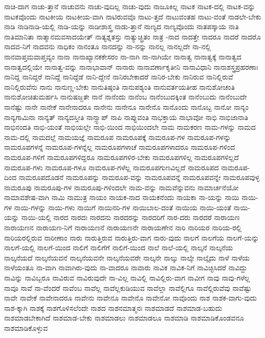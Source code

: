{ನಾಚಿ-ದಾಗ
ನಾಚು-ತ್ತಾನೆ
ನಾಚುವನು
ನಾಚು-ವುದಿಲ್ಲ
ನಾಚು-ವುದು
ನಾಜೂಕಿಲ್ಲ
ನಾಟಕ
ನಾಟಕ-ದಲ್ಲಿ
ನಾಟಕ-ವನ್ನು
ನಾಟಕವೊಂದು
ನಾಟಕೀಯ
ನಾಟಕೀಯ-ವಾಗಿ
ನಾಟಿರುವವೊ
ನಾಟು-ತ್ತದೆ
ನಾಟುವಂತಹ
ನಾಟು-ವಂತೆ
ನಾಡಲೇ-ಬೇಕು
ನಾಡಿ
ನಾಡಿನಾಡಿ-ಯಲ್ಲಿ
ನಾಡಿ-ಯನ್ನು
ನಾಡೀಶಾಸ್ತ್ರ
ನಾಡು-ತ್ತಾನೆ
ನಾಣ್ಯದ
ನಾಣ್ಯವೊಂದು
ನಾತಪಸ್ಕಾಯ
ನಾತಿ
ನಾತಿಮಾನಿತಾ
ನಾತ್ಮಾನಮವಸಾದಯೇತ್
ನಾತ್ಯಶ್ನತಸ್ತು
ನಾತ್ಯುಚ್ಛ್ರಿತಂ
ನಾತ್ರ
-ನಾದ
ನಾದತ್ತೇ
ನಾದರೂ
ನಾದರೆ
ನಾದರೊ
ನಾದವ-ನಿಗೆ
ನಾದವನು
ನಾಧಿಕಂ
ನಾನಂತೂ
ನಾನದನ್ನು
ನಾ-ನನ್ನು
ನಾನಲ್ಲ
ನಾನಲ್ಲದೇ
ನಾ-ನಲ್ಲಿ
ನಾನವಾಪ್ತಮವಾಪ್ತವ್ಯಂ
ನಾನಾ
ನಾನಾಖ್ಯಾನಕಕೇಸರಂ
ನಾ-ನಾಗಿ
ನಾ-ನಾಗಿಯೇ
ನಾನಾತ್ವ
ನಾನಾತ್ವಕ್ಕೆ
ನಾನಾತ್ವದ
ನಾನಾತ್ವದಲ್ಲಿಯೇ
ನಾನಾತ್ವ-ವನ್ನು
ನಾನಾಭಾವಾನ್
ನಾನಾರು
ನಾನಾವರ್ಣಾಕೃತೀನಿ
ನಾನಾವಿಧಾನಿ
ನಾನಾಶಸ್ತ್ರಪ್ರಹರಣಾಃ
ನಾನಿದ್ದ
ನಾನಿದ್ದರೆ
ನಾನಿದ್ದೆ
ನಾನಿದ್ದೆಡೆ
ನಾನಿ-ದ್ದೇನೆ
ನಾನಿರಬೇಕಾದರೆ
ನಾನಿರ-ಬೇಕು
ನಾನಿರುವ
ನಾನಿಲ್ಲಿರುವೆ
ನಾನಿಲ್ಲಿರುವೆನು
ನಾನು
ನಾನುಣ್ಣ-ಬೇಕು
ನಾನುತಿಷ್ಠಂತಿ
ನಾನುಪಶ್ಯಂತಿ
ನಾನುವರ್ತಯತೀಹ
ನಾನುಶೋಚಂತಿ
ನಾನುಶೋಚಿತುಮರ್ಹಸಿ
ನಾನುಷಜ್ಜತೇ
ನಾನೆ
ನಾನೆಂದು
ನಾನೆಂಬ
ನಾನೆಂಬುದಕ್ಕಿಂತ
ನಾನೆಂಬುದು
ನಾನೆಂಬುದೇ
ನಾನೆಷ್ಟು
ನಾನೇ
ನಾನೇಕೆ
ನಾನೇನಾದರೂ
ನಾನೇನು
ನಾನೇನೂ
ನಾನೇನೊ
ನಾನೊಂದು
ನಾನೊಬ್ಬ
ನಾನೋ
ನಾನ್ಯಂ
ನಾನ್ಯಗಾಮಿನಾ
ನಾನ್ಯತ್
ನಾನ್ಯದಸ್ತೀತಿ
ನಾನ್ಸ್ಟಾಪ್
ನಾಪಿ
ನಾಪ್ನುವಂತಿ
ನಾಭಕ್ತಾಯ
ನಾಭಾವೋ
ನಾಭಿ
ನಾಭಿಜಾನಾತಿ
ನಾಭಿನಂದತಿ
ನಾಭಿ-ಯಂತೆ
ನಾಭಿಯಲ್ಲೇ
ನಾಭಿ-ಯಿಂದ
ನಾಭಿಯಿಂದಲೇ
ನಾಮ
ನಾಮಕರಣ
ನಾಮ-ಗಳನ್ನು
ನಾಮದ
ನಾಮ-ದಲ್ಲಿ
ನಾಮದಲ್ಲೆ
ನಾಮಯಜ್ಞೆ
ನಾಮರೂಪ
ನಾಮರೂಪಕ್ಕೆ
ನಾಮರೂಪ-ಗಳ
ನಾಮರೂಪ-ಗಳನ್ನು
ನಾಮರೂಪಗಳನ್ನೆ
ನಾಮರೂಪ-ಗಳನ್ನೆಲ್ಲ
ನಾಮರೂಪಗಳಾಚೆ
ನಾಮರೂಪಗಳಾದರೂ
ನಾಮರೂಪ-ಗಳಿಂದ
ನಾಮರೂಪ-ಗಳಿಗೆ
ನಾಮರೂಪಗಳಿದ್ದರೂ
ನಾಮರೂಪಗಳಿರ-ಬೇಕು
ನಾಮರೂಪಗಳಿಲ್ಲ
ನಾಮರೂಪಗಳಿಲ್ಲದೆ
ನಾಮರೂಪ-ಗಳು
ನಾಮರೂಪ-ಗಳೂ
ನಾಮರೂಪ-ಗಳೆಲ್ಲ
ನಾಮರೂಪಗುಣವಿಲ್ಲದೆ
ನಾಮರೂಪದ
ನಾಮರೂಪ-ದಿಂದ
ನಾಮರೂಪದೊಡನೆ
ನಾಮರೂಪನ್ನು
ನಾಮರೂಪ-ವನ್ನು
ನಾಮರೂಪವನ್ನೆ
ನಾಮರೂಪವನ್ನೇ
ನಾಮರೂಪವುಳ್ಳ
ನಾಮರೂಪು
ನಾಮರೂಪು-ಗಳ
ನಾಮರೂಪು-ಗಳಿಂದಲೇ
ನಾಮ-ವನ್ನು
ನಾಮವೆನ್ನುವನು
ನಾಮಾರ್ಚನೆಯೋ
ನಾಮಾವಶೇಷ-ವಾಗಿ
ನಾಮಿ
ನಾಮುತ್ರ
ನಾಯಂ
ನಾಯಕ-ನಾದ
ನಾಯಕನೆಂದು
ನಾಯಕಾ
ನಾ-ಯನ್ನು
ನಾಯಿ
ನಾಯಿ-ಗಳ
ನಾಯಿ-ಗಳನ್ನು
ನಾಯಿ-ಗಳು
ನಾಯಿಗೆ
ನಾಯಿನರಿ-ಗಳ
ನಾಯಿಬಾಲ-ದಂತೆ
ನಾಯಿಯ
ನಾಯಿ-ಯಂತೆ
ನಾಯಿ-ಯನ್ನು
ನಾಯಿ-ಯಲ್ಲಿ
ನಾರದ
ನಾರದಃ
ನಾರದನು
ನಾರದರನ್ನು
ನಾರದರಿಗೆ
ನಾರ-ದರು
ನಾರದರೆ
ನಾರಾಯಣ
ನಾರಾಯಣನ
ನಾರಾಯಣ-ನಿಗೆ
ನಾರಾಯಣನೆ
ನಾರಾಯಣನೇ
ನಾರಾಯಣೇನ
ನಾರಿ
ನಾರಿಯರ
ನಾರಿಯ-ರಲ್ಲಿ
ನಾರಿಯರಲ್ಲಿರುವ
ನಾರೀಣಾಂ
ನಾರು
ನಾರುತ್ತಿರುವ
ನಾರುತ್ತಿರು-ವಾಗ
ನಾರು-ವುದು
ನಾಲಗೆ
ನಾಲಗೆಯ
ನಾಲಗೆ-ಯನ್ನು
ನಾಲಗೆ-ಯಲ್ಲಿ
ನಾಲಗೆ-ಯಿಂದ
ನಾಲಿಗೆ
ನಾಲಿಗೆಗೆ
ನಾಲಿಗೆ-ಯಿಂದ
ನಾಲೆ
ನಾಲೆ-ಯಲ್ಲಿ
ನಾಲ್ಕನೆ
ನಾಲ್ಕನೆಯ
ನಾಲ್ಕನೆಯದೆ
ನಾಲ್ಕನೆಯವನೆ
ನಾಲ್ಕನೆಯವನೇ
ನಾಲ್ಕನೆಯವರೇ
ನಾಲ್ಕನೇ
ನಾಲ್ಕು
ನಾಲ್ಕೇ
ನಾಲ್ಕೈದು
ನಾಳೆ
ನಾಳೆಯ
ನಾಳೆಯಂತೂ
ನಾ-ವಾಗಿ
ನಾವಾಗಿರು-ವುದು
ನಾ-ವಾದರೂ
ನಾವಾರು
ನಾವಿಕ
ನಾವಿಕ-ನಿಗೆ
ನಾವಿಚ್ಛಿಸಿದರೆ
ನಾವಿದ್ದು
ನಾವಿನ್ನು
ನಾವಿಬ್ಬರೂ
ನಾವಿರುವ
ನಾವಿರುವುದೇ
ನಾ-ವಿಲ್ಲ
ನಾವಿಲ್ಲಿ
ನಾವಿಲ್ಲಿರು-ವಾಗ
ನಾವೀಗ
ನಾವು
ನಾವು-ಗಳೆಲ್ಲ
ನಾವೂ
ನಾವೆ
ನಾ-ವೆಂದರೆ
ನಾವೆಂಬ
ನಾವೆಲ್ಲ
ನಾವೆಲ್ಲಕುಡಿಯುವ
ನಾವೆಲ್ಲಾ
ನಾವೆಲ್ಲಿಗೂ
ನಾವೆಲ್ಲಿರುವೆವು
ನಾವೆಷ್ಟು
ನಾವೇ
ನಾವೇಕೆ
ನಾವೇನಾದರೂ
ನಾವೇನು
ನಾವೇನೂ
ನಾವೇನೊ
ನಾವೇನೋ
ನಾವೊಂದು
ನಾಶ
ನಾಶಕ-ವಾಗು-ವುದು
ನಾಶ-ಕ್ಕಾಗಿ
ನಾಶಕ್ಕೆ
ನಾಶಗೊಳಿಸಲೆಂದೇ
ನಾಶದ
ನಾಶನಮಾತ್ಮನಃ
ನಾಶಮಾಡದೆ
ನಾಶಮಾಡ-ಬಹುದು
ನಾಶಮಾಡಬೇಕಾಗಿದೆ
ನಾಶಮಾಡ-ಬೇಕು
ನಾಶಮಾಡಲು
ನಾಶಮಾಡಲೂ
ನಾಶಮಾಡಿ
ನಾಶಮಾಡಿಕೊಂಡವನೂ
ನಾಶಮಾಡಿಕೊಳ್ಳುವ
}
